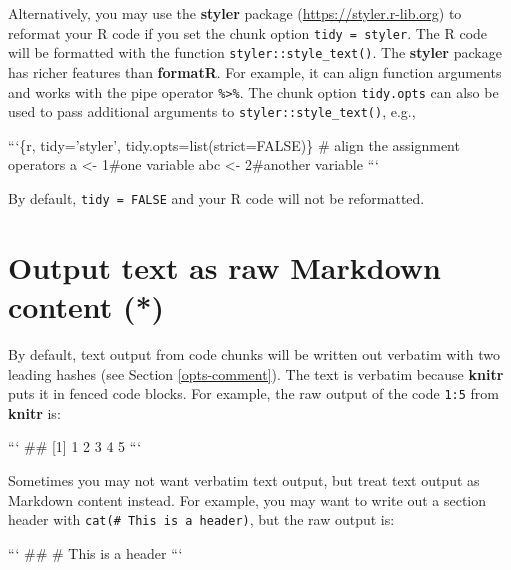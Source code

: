 \documentclass[
  11pt,
]{krantz}
\newenvironment{Shaded}{\begin{snugshade}}{\end{snugshade}}
\newcommand{\BaseNTok}[1]{\textcolor[rgb]{0.06,0.06,0.06}{#1}}
\begin{document}
Alternatively, you may use the \textbf{styler} package (\url{https://styler.r-lib.org}) to reformat your R code if you set the chunk option \texttt{tidy\ =\ \textquotesingle{}styler\textquotesingle{}}. The R code will be formatted with the function \texttt{styler::style\_text()}. The \textbf{styler} package has richer features than \textbf{formatR}. For example, it can align function arguments and works with the pipe operator \texttt{\%\textgreater{}\%}. The chunk option \texttt{tidy.opts} can also be used to pass additional arguments to \texttt{styler::style\_text()}, e.g.,

\begin{Shaded}
\begin{Highlighting}[]
\BaseNTok{```\{r, tidy='styler', tidy.opts=list(strict=FALSE)\}}
\BaseNTok{# align the assignment operators}
\BaseNTok{a   <- 1#one variable}
\BaseNTok{abc <- 2#another variable}
\BaseNTok{```}
\end{Highlighting}
\end{Shaded}

By default, \texttt{tidy\ =\ FALSE} and your R code will not be reformatted.

\hypertarget{results-asis}{%
\section{Output text as raw Markdown content (*)}\label{results-asis}}

By default, text output from code chunks will be written out verbatim with two leading hashes (see Section \ref{opts-comment}). The text is verbatim because \textbf{knitr} puts it in fenced code blocks. For example, the raw output of the code \texttt{1:5} from \textbf{knitr} is:

\begin{Shaded}
\begin{Highlighting}[]
\BaseNTok{```}
\BaseNTok{## [1] 1 2 3 4 5}
\BaseNTok{```}
\end{Highlighting}
\end{Shaded}

Sometimes you may not want verbatim text output, but treat text output as Markdown content instead. For example, you may want to write out a section header with \texttt{cat(\textquotesingle{}\#\ This\ is\ a\ header\textquotesingle{})}, but the raw output is:

\begin{Shaded}
\begin{Highlighting}[]
\BaseNTok{```}
\BaseNTok{## # This is a header}
\BaseNTok{```}
\end{Highlighting}
\end{Shaded}
\end{document}
